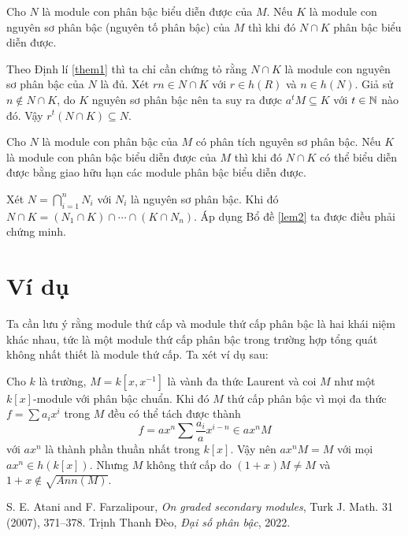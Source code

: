 \begin{lemma}
    \label{lem2}
    Cho $N$ là module con phân bậc biểu diễn được của $M$. Nếu $K$ là module con nguyên sơ phân bậc (nguyên tố phân bậc) của $M$ thì khi đó $N \cap K$ phân bậc biểu diễn được.
\end{lemma}
\startproof Theo Định lí \ref{them1} thì ta chỉ cần chứng tỏ rằng $N \cap K$ là module con nguyên sơ phân bậc của $N$ là đủ. Xét $rn \in N \cap K$ với $r \in h(R)$ và $n \in h(N)$. Giả sử $n \notin N \cap K$, do $K$ nguyên sơ phân bậc nên ta suy ra được $a^tM \subseteq K$ với $t \in \mathbb N$ nào đó. Vậy $r^t(N \cap K) \subseteq N$. \QED

\begin{theorem}
    Cho $N$ là module con phân bậc của $M$ có phân tích nguyên sơ phân bậc. Nếu $K$ là module con phân bậc biểu diễn được của $M$ thì khi đó $N \cap K$ có thể biểu diễn được bằng giao hữu hạn các module phân bậc biểu diễn được.
\end{theorem}
\startproof Xét $N = \bigcap_{i=1}^n N_i$ với $N_i$ là nguyên sơ phân bậc. Khi đó $N \cap K = (N_1 \cap K) \cap \cdots \cap (K \cap N_n)$. Áp dụng Bổ đề \ref{lem2} ta được điều phải chứng minh. \QED

\section{Ví dụ}
Ta cần lưu ý rằng module thứ cấp và module thứ cấp phân bậc là hai khái niệm khác nhau, tức là một module thứ cấp phân bậc trong trường hợp tổng quát không nhất thiết là module thứ cấp. Ta xét ví dụ sau:
\begin{example}
    Cho $k$ là trường, $M = k[x,x^{-1}]$ là vành đa thức Laurent và coi $M$ như một $k[x]$-module với phân bậc chuẩn. Khi đó $M$ thứ cấp phân bậc vì mọi đa thức $f = \sum a_ix^i$ trong $M$ đều có thể tách được thành
    $$
        f = ax^n\sum \frac{a_i}{a}x^{i-n} \in ax^nM
    $$
    với $ax^n$ là thành phần thuần nhất trong $k[x]$. Vậy nên $ax^n M = M$ với mọi $ax^n \in h(k[x])$. Nhưng $M$ không thứ cấp do $(1+x)M \neq M$ và $1+x \notin \sqrt{Ann(M)}$.
\end{example}

\renewcommand\refname{Tài liệu tham khảo}
\begin{thebibliography}{9}
     S. E. Atani and F. Farzalipour, \textit{On graded secondary modules}, Turk J. Math. 31 (2007), 371–378.
     Trịnh Thanh Đèo, \textit{Đại số phân bậc}, 2022.
\end{thebibliography}


